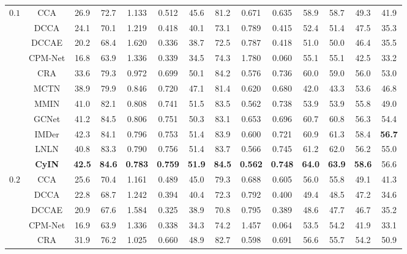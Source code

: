 \documentclass{article}
\begin{document}
\begin{table}[htbp]
{\begin{tabular}{cccccccccccccc}
    \midrule[1.5pt]
     \multirow{11}{*}{$0.1$} ~ & CCA & 26.9  & 72.7  & 1.133  & 0.512  & 45.6  & 81.2  & 0.671  & 0.635  & 58.9  & 58.7  & 49.3  & 41.9  \\ 
        ~ & DCCA & 24.1  & 70.1  & 1.219  & 0.418  & 40.1  & 73.1  & 0.789  & 0.415  & 52.4  & 51.4  & 47.5  & 35.3  \\ 
        ~ & DCCAE & 20.2  & 68.4  & 1.620  & 0.336  & 38.7  & 72.5  & 0.787  & 0.418  & 51.0  & 50.0  & 46.4  & 35.5  \\ 
        ~ & CPM-Net & 16.8  & 63.9  & 1.336  & 0.339  & 34.5  & 74.3  & 1.780  & 0.060  & 55.1  & 55.1  & 42.5  & 33.2  \\ 
        ~ & CRA & 33.6  & 79.3  & 0.972  & 0.699  & 50.1  & 84.2  & 0.576  & 0.736  & 60.0  & 59.0  & 56.0  & 53.0  \\ 
        ~ & MCTN & 38.9 & 79.9 & 0.846 & 0.720  & 47.1  & 81.4  & 0.620  & 0.680  & 42.0  & 43.3  & 53.6  & 46.8  \\ 
        ~ & MMIN & 41.0  & 82.1  & 0.808  & 0.741  & 51.5  & 83.5  & 0.562  & 0.738  & 53.9  & 53.9  & 55.8  & 49.0 \\ 
        ~ & GCNet & 41.2  & 84.5  & 0.806  & 0.751  & 50.3  & 83.1  & 0.653  & 0.696  & 60.7  & 60.8  & 56.3  & 54.4  \\ 
        ~ & IMDer & 42.3  & 84.1  & 0.796  & 0.753  & 51.4  & 83.9  & 0.600  & 0.721  & 60.9  & 61.3  & 58.4  & \textbf{56.7} \\ 
        ~ & LNLN & 40.8  & 83.3  & 0.790  & 0.756  & 51.4  & 83.7  & 0.566  & 0.745  & 61.2  & 62.0  & 56.2  & 55.0  \\ 
    & \textbf{CyIN} & \textbf{42.5} & \textbf{84.6} & \textbf{0.783} & \textbf{0.759} & \textbf{51.9} & \textbf{84.5} & \textbf{0.562} & \textbf{0.748} & \textbf{64.0} & \textbf{63.9} & \textbf{58.6} & 56.6 \\ 
    \midrule[0.5pt]
    \multirow{11}{*}{$0.2$} ~ & CCA & 25.6  & 70.4  & 1.161  & 0.489  & 45.0  & 79.3  & 0.688  & 0.605  & 56.0  & 55.8  & 49.1  & 41.3  \\ 
        ~ & DCCA & 22.8  & 68.7  & 1.242  & 0.394  & 40.4  & 72.3  & 0.792  & 0.400  & 49.4  & 48.5  & 47.2  & 34.6  \\ 
        ~ & DCCAE & 20.9  & 67.6  & 1.584  & 0.325  & 38.9  & 70.8  & 0.795  & 0.389  & 48.6  & 47.7  & 46.7  & 35.2  \\ 
        ~ & CPM-Net & 16.9  & 63.9  & 1.336  & 0.338  & 34.3  & 74.2  & 1.457  & 0.064  & 53.5  & 54.2  & 41.9  & 33.1  \\ 
        ~ & CRA & 31.9  & 76.2  & 1.025  & 0.660  & 48.9  & 82.7  & 0.598  & 0.691  & 56.6  & 55.7  & 54.2  & 50.9  \\ 

\end{tabular}}
\end{table}
\end{document}
